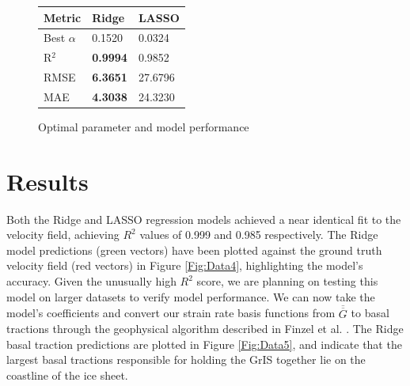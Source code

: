 \documentclass{article}
\begin{document}
\begin{figure}[!htb]
   \begin{minipage}{0.33\textwidth}
    \centering
     \begin{tabular}{l|l|l}
        \textbf{Metric} & \textbf{Ridge} & \textbf{LASSO} \\
        \hline
        Best $\alpha$ & 0.1520 & 0.0324 \\
        R$^{2}$ & \textbf{0.9994} & 0.9852 \\
        RMSE & \textbf{6.3651} & 27.6796 \\
        MAE & \textbf{4.3038} & 24.3230 \\
    \end{tabular}
    \caption{Optimal parameter and model performance}\label{Fig:Data1c}
  \end{minipage}
\end{figure}

\section{Results}

Both the Ridge and LASSO regression models achieved a near identical fit to the velocity field, achieving $R^{2}$ values of 0.999 and 0.985 respectively. The Ridge model predictions (green vectors) have been plotted against the ground truth velocity field (red vectors) in Figure \ref{Fig:Data4}, highlighting the model's accuracy. Given the unusually high $R^{2}$ score, we are planning on testing this model on larger datasets to verify model performance. We can now take the model's coefficients and convert our strain rate basis functions from $\overline{\overline{G}}$ to basal tractions through the geophysical algorithm described in Finzel et al. \cite{finzel_surface_2015}. The Ridge basal traction predictions are plotted in Figure \ref{Fig:Data5}, and indicate that the largest basal tractions responsible for holding the GrIS together lie on the coastline of the ice sheet.

\end{document}
